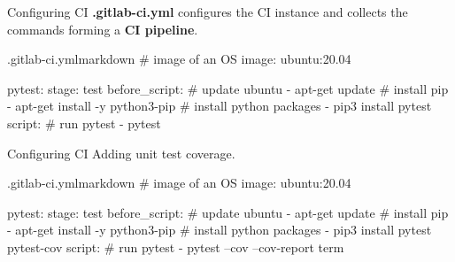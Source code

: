\documentclass{setbeamer}
\begin{document}
\begin{frame}[fragile]{Configuring CI}
			\textbf{.gitlab-ci.yml} configures the CI instance and collects the commands forming a \textbf{CI pipeline}.

\begin{TUMCodeBlock}{.gitlab-ci.yml}{markdown}
# image of an OS
image: ubuntu:20.04

pytest:
  stage: test
  before_script:
    # update ubuntu
    - apt-get update
    # install pip
    - apt-get install -y python3-pip
    # install python packages
    - pip3 install pytest
  script:
    # run pytest
    - pytest
\end{TUMCodeBlock}
            
            
\end{frame}

\begin{frame}[fragile]{Configuring CI}
			Adding unit test coverage.

\begin{TUMCodeBlock}{.gitlab-ci.yml}{markdown}
# image of an OS
image: ubuntu:20.04

pytest:
  stage: test
  before_script:
    # update ubuntu
    - apt-get update
    # install pip
    - apt-get install -y python3-pip
    # install python packages
    - pip3 install pytest pytest-cov
  script:
    # run pytest
    - pytest --cov --cov-report term
\end{TUMCodeBlock}
            
            
\end{frame}
\end{document}
